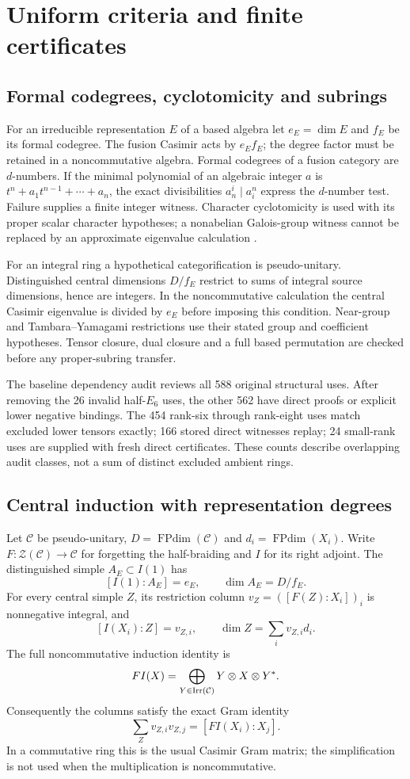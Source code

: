 \documentclass[11pt,a4paper]{article}
\theoremstyle{remark}\newtheorem{remark}[theorem]{Remark}
\newcommand{\FPdim}{\operatorname{FPdim}}\newcommand{\Rep}{\operatorname{Rep}}
\begin{document}
\section{Uniform criteria and finite certificates}
\subsection{Formal codegrees, cyclotomicity and subrings}
For an irreducible representation $E$ of a based algebra let $e_E=\dim E$
and $f_E$ be its formal codegree. The fusion Casimir acts by $e_Ef_E$;
the degree factor must be retained in a noncommutative algebra. Formal
codegrees of a fusion category are $d$-numbers. If the minimal polynomial
of an algebraic integer $a$ is
$t^n+a_1t^{n-1}+\cdots+a_n$, the exact divisibilities
$a_n^i\mid a_i^n$ express the $d$-number test. Failure supplies a finite
integer witness. Character cyclotomicity is used with its proper scalar
character hypotheses; a nonabelian Galois-group witness cannot be replaced
by an approximate eigenvalue calculation \cite{ENO,Ostrik}.

For an integral ring a hypothetical categorification is pseudo-unitary.
Distinguished central dimensions $D/f_E$ restrict to sums of integral source
dimensions, hence are integers. In the noncommutative calculation the
central Casimir eigenvalue is divided by $e_E$ before imposing this
condition. Near-group and Tambara--Yamagami restrictions use their stated
group and coefficient hypotheses. Tensor closure, dual closure and a full
based permutation are checked before any proper-subring transfer.

The baseline dependency audit reviews all 588 original structural uses.
After removing the 26 invalid half-$E_6$ uses, the other 562 have direct
proofs or explicit lower negative bindings. The 454 rank-six through
rank-eight uses match excluded lower tensors exactly; 166 stored direct
witnesses replay; 24 small-rank uses are supplied with fresh direct
certificates. These counts describe overlapping audit classes, not a sum
of distinct excluded ambient rings.

\subsection{Central induction with representation degrees}
Let $\mathcal C$ be pseudo-unitary, $D=\FPdim(\mathcal C)$ and
$d_i=\FPdim(X_i)$. Write $F:\mathcal Z(\mathcal C)\to\mathcal C$ for
forgetting the half-braiding and $I$ for its right adjoint. The
distinguished simple $A_E\subset I(1)$ has
\[
 [I(1):A_E]=e_E,\qquad \dim A_E=D/f_E.
\]
For every central simple $Z$, its restriction column
$v_Z=([F(Z):X_i])_i$ is nonnegative integral, and
\[
 [I(X_i):Z]=v_{Z,i},\qquad \dim Z=\sum_iv_{Z,i}d_i.
\]
The full noncommutative induction identity is
\[
 F I(X)=\bigoplus_{Y\in\operatorname{Irr}(\mathcal C)}Y\otimes X\otimes Y^*.
\]
Consequently the columns satisfy the exact Gram identity
\[
 \sum_Zv_{Z,i}v_{Z,j}=[FI(X_i):X_j].
\]
In a commutative ring this is the usual Casimir Gram matrix; the simplification
is not used when the multiplication is noncommutative.
\end{document}
